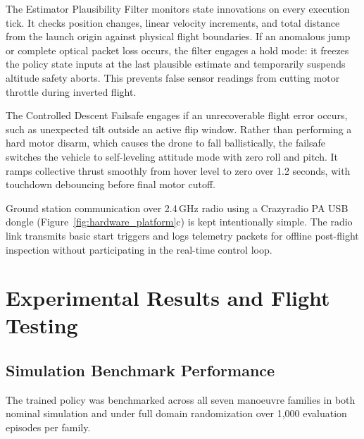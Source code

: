\documentclass[11pt,a4paper]{article}
\begin{document}
The Estimator Plausibility Filter monitors state innovations on every execution tick. It checks position changes, linear velocity increments, and total distance from the launch origin against physical flight boundaries. If an anomalous jump or complete optical packet loss occurs, the filter engages a hold mode: it freezes the policy state inputs at the last plausible estimate and temporarily suspends altitude safety aborts. This prevents false sensor readings from cutting motor throttle during inverted flight.

The Controlled Descent Failsafe engages if an unrecoverable flight error occurs, such as unexpected tilt outside an active flip window. Rather than performing a hard motor disarm, which causes the drone to fall ballistically, the failsafe switches the vehicle to self-leveling attitude mode with zero roll and pitch. It ramps collective thrust smoothly from hover level to zero over 1.2 seconds, with touchdown debouncing before final motor cutoff.

Ground station communication over 2.4\,GHz radio using a Crazyradio PA USB dongle (Figure~\ref{fig:hardware_platform}c) is kept intentionally simple. The radio link transmits basic start triggers and logs telemetry packets for offline post-flight inspection without participating in the real-time control loop.

\section{Experimental Results and Flight Testing}
\label{sec:results}

\subsection{Simulation Benchmark Performance}
The trained policy was benchmarked across all seven manoeuvre families in both nominal simulation and under full domain randomization over 1,000 evaluation episodes per family.
\end{document}
